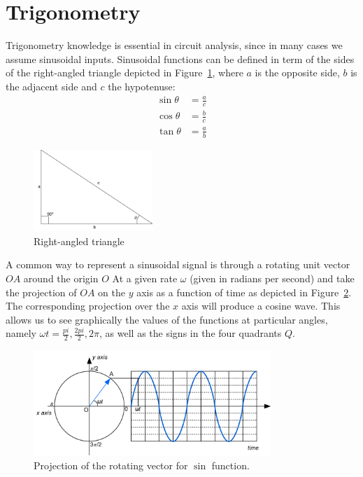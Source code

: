 \section{Trigonometry}
Trigonometry knowledge is essential in circuit analysis, since in many cases we assume sinusoidal inputs. Sinusoidal functions can be defined in term of the sides of the right-angled triangle depicted in Figure~\ref{Fig:Triangle}, where $a$ is the opposite side, $b$ is the adjacent side and $c$ the hypotenuse:
\begin{equation}
\begin{split}
\sin\theta &= \frac{a}{c}\\
\cos\theta &= \frac{b}{c}\\
\tan\theta &= \frac{a}{b}
\end{split}
\end{equation}
\begin{figure}[h!]
  \centering  \includegraphics[width=0.4\textwidth]{"images/Triangle"}
  \caption{Right-angled triangle} 
  \label{Fig:Triangle}
\end{figure}
A common way to represent a sinusoidal signal is through a rotating unit vector $OA$ around the origin $O$ At a given rate $\omega$ (given in radians per second) and take the projection of $OA$ on the $y$ axis as a function of time as depicted in Figure~\ref{Fig:Sinusoidal}. The corresponding projection over the $x$ axis will produce a cosine wave. This allows us to see graphically the values of the functions at particular angles, namely $\omega t= \frac{pi}{2}, \frac{2pi}{2}, 2\pi$, as well as the signs in the four quadrants $Q$. 
\begin{figure}[h!]
  \centering
  \includegraphics[width=0.8\textwidth]{"images/Sinusoidal"}
  \caption{Projection of the rotating vector for $\sin$ function.} 
  \label{Fig:Sinusoidal}
\end{figure}
